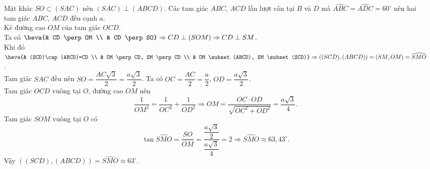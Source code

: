 \begin{ex}
{\begin{itemchoice}
			Mặt khác $SO \subset (SAC)$ nên $(SAC) \perp (ABCD)$. 
			\itemch Các  tam giác $ABC$, $ACD$ lần lượt cân tại $B$ và $D$ mà $\widehat{ABC}=\widehat{ADC}=60^\circ$ nên hai tam giác $ABC$, $ACD$ đều cạnh $a$.\\
			Kẻ  đường cao $OM$ của tam giác $OCD$.\\
			Ta có $\heva{& CD \perp OM \\ &  CD \perp SO} \Rightarrow CD \perp (SOM) \Rightarrow CD \perp SM$.\\
			Khi đó $\heva{& (SCD)\cap  (ABCD)=CD \\ & OM \perp CD, SM \perp CD \\ & OM \subset (ABCD), SM \subset (SCD)} \Rightarrow \left((SCD),(ABCD)\right)=(SM,OM)=\widehat{SMO}$.\\
			 Tam giác $SAC$ đều nên $SO = \dfrac{AC \sqrt{3}}{2}=\dfrac{a \sqrt{3}}{2}$.
			\itemch  Ta có $OC=\dfrac{AC}{2}=\dfrac{a}{2}$, $OD=\dfrac{a \sqrt{3}}{2}$.\\
			Tam giác  $OCD$ vuông tại $O$, đường cao $OM$ nên
			 $$\dfrac{1}{OM^2}=\dfrac{1}{OC^2}+\dfrac{1}{OD^2} \Rightarrow OM = \dfrac{OC \cdot OD}{\sqrt{OC^2+OD^2}}=\dfrac{a \sqrt{3}}{4}.$$
			Tam giác $SOM$ vuông tại $O$ có 
			$$\tan  \widehat{SMO}=\dfrac{SO}{OM}=\dfrac{\dfrac{a \sqrt{3}}{2}}{\dfrac{a \sqrt{3}}{4}}=2 \Rightarrow \widehat{SMO} \approx 63{,}43^{\circ}.$$
			Vậy $\left((SCD),(ABCD)\right)=\widehat{SMO} \approx 63^\circ$. 
		\end{itemchoice}
	 }
\end{ex}

